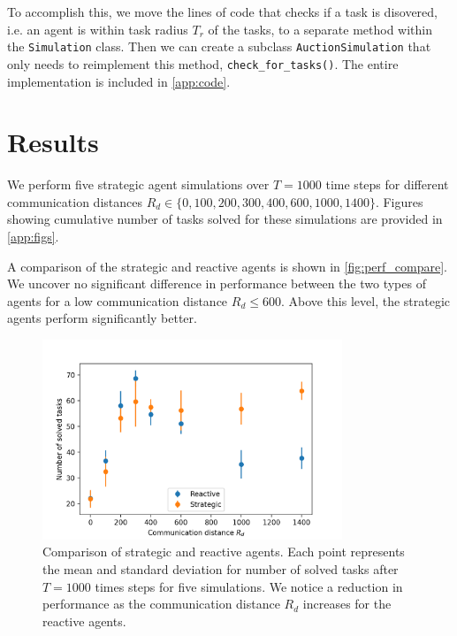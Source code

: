 \documentclass[11pt]{article}
\begin{document}
        To accomplish this, we move the lines of code that checks if a task is 
        disovered, i.e. an agent is within task radius $T_r$ of the tasks, to a
        separate method within the \lstinline|Simulation| class. Then we can 
        create a subclass \lstinline|AuctionSimulation| that only needs to 
        reimplement this method, \lstinline|check_for_tasks()|. The entire implementation is 
        included in \autoref{app:code}.

    \section{Results}

        We perform five strategic agent simulations over $T=1000$ time steps for 
        different communication distances $R_d\in\{0, 100, 200, 300, 400, 600, 1000, 1400\}$.
        Figures showing cumulative number of tasks solved for these simulations are 
        provided in \autoref{app:figs}.

        A comparison of the strategic and reactive agents is shown in \autoref{fig:perf_compare}.
        We uncover no significant difference in performance between the two types of 
        agents for a low communication distance $R_d\leq600$. Above this level, the strategic
        agents perform significantly better.

        \begin{figure}
            \centering
            \includegraphics[width=0.8\textwidth]{figures/perf_compare.png}
            \caption{
                Comparison of strategic and reactive agents. Each point represents 
                the mean and standard deviation for number of solved tasks
                after $T=1000$ times steps for 
                five simulations. We notice a reduction in performance as the 
                communication distance $R_d$ increases for the reactive agents.
                \label{fig:perf_compare} 
            }
        \end{figure}
\end{document}
